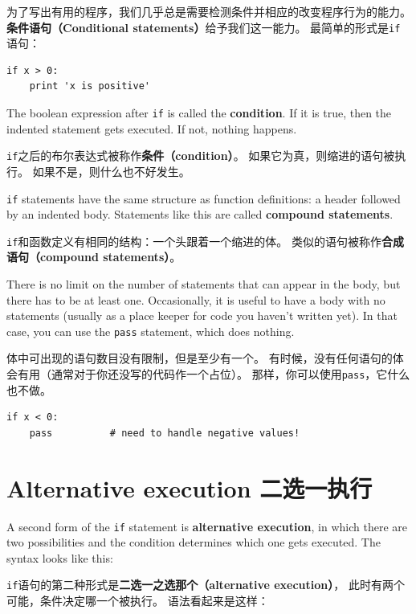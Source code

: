 \documentclass[10pt]{book}
\begin{document}
\begin{CJK}{UTF8}{gbsn}
为了写出有用的程序，我们几乎总是需要检测条件并相应的改变程序行为的能力。
{\bf 条件语句（Conditional statements）}给予我们这一能力。
最简单的形式是{\tt if}语句：

\begin{verbatim}
if x > 0:
    print 'x is positive'
\end{verbatim}
%
The boolean expression after {\tt if} is
called the {\bf condition}.  If it is true, then the indented
statement gets executed.  If not, nothing happens.

{\tt if}之后的布尔表达式被称作{\bf 条件（condition）}。
如果它为真，则缩进的语句被执行。
如果不是，则什么也不好发生。

{\tt if} statements have the same structure as function definitions:
a header followed by an indented body.  Statements like this are
called {\bf compound statements}.

{\tt if}和函数定义有相同的结构：一个头跟着一个缩进的体。
类似的语句被称作{\bf 合成语句（compound statements）}。

There is no limit on the number of statements that can appear in
the body, but there has to be at least one.
Occasionally, it is useful to have a body with no statements (usually
as a place keeper for code you haven't written yet).  In that
case, you can use the {\tt pass} statement, which does nothing.

体中可出现的语句数目没有限制，但是至少有一个。
有时候，没有任何语句的体会有用（通常对于你还没写的代码作一个占位）。
那样，你可以使用{\tt pass}，它什么也不做。

\begin{verbatim}
if x < 0:
    pass          # need to handle negative values!
\end{verbatim}
%

\section{Alternative execution 二选一执行}
\label{alternative.execution}

A second form of the {\tt if} statement is {\bf alternative execution},
in which there are two possibilities and the condition determines
which one gets executed.  The syntax looks like this:

{\tt if}语句的第二种形式是{\bf 二选一之选那个（alternative execution）}，
此时有两个可能，条件决定哪一个被执行。
语法看起来是这样：


\end{CJK}
\end{document}
